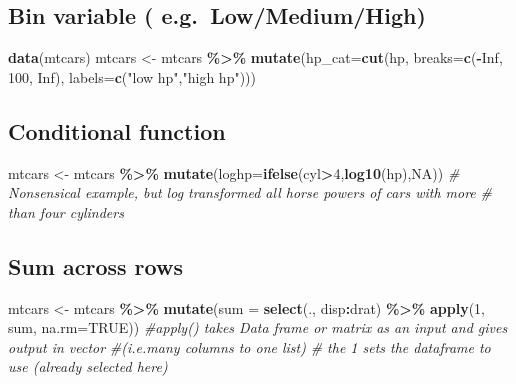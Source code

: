 \documentclass[
]{article}
\newenvironment{Shaded}{\begin{snugshade}}{\end{snugshade}}
\newcommand{\AttributeTok}[1]{\textcolor[rgb]{0.13,0.29,0.53}{#1}}
\newcommand{\CommentTok}[1]{\textcolor[rgb]{0.56,0.35,0.01}{\textit{#1}}}
\newcommand{\ConstantTok}[1]{\textcolor[rgb]{0.56,0.35,0.01}{#1}}
\newcommand{\DecValTok}[1]{\textcolor[rgb]{0.00,0.00,0.81}{#1}}
\newcommand{\FunctionTok}[1]{\textcolor[rgb]{0.13,0.29,0.53}{\textbf{#1}}}
\newcommand{\NormalTok}[1]{#1}
\newcommand{\OtherTok}[1]{\textcolor[rgb]{0.56,0.35,0.01}{#1}}
\newcommand{\SpecialCharTok}[1]{\textcolor[rgb]{0.81,0.36,0.00}{\textbf{#1}}}
\newcommand{\StringTok}[1]{\textcolor[rgb]{0.31,0.60,0.02}{#1}}
\begin{document}
\hypertarget{bin-variable-e.g.-lowmediumhigh}{%
\subsection{Bin variable ( e.g.~Low/Medium/High)}\label{bin-variable-e.g.-lowmediumhigh}}

\begin{Shaded}
\begin{Highlighting}[]
\FunctionTok{data}\NormalTok{(mtcars)}
\NormalTok{mtcars }\OtherTok{\textless{}{-}}\NormalTok{ mtcars }\SpecialCharTok{\%\textgreater{}\%} \FunctionTok{mutate}\NormalTok{(}\AttributeTok{hp\_cat=}\FunctionTok{cut}\NormalTok{(hp, }\AttributeTok{breaks=}\FunctionTok{c}\NormalTok{(}\SpecialCharTok{{-}}\ConstantTok{Inf}\NormalTok{, }\DecValTok{100}\NormalTok{, }\ConstantTok{Inf}\NormalTok{), }
                                       \AttributeTok{labels=}\FunctionTok{c}\NormalTok{(}\StringTok{"low hp"}\NormalTok{,}\StringTok{"high hp"}\NormalTok{)))}
\end{Highlighting}
\end{Shaded}

\hypertarget{conditional-function}{%
\subsection{Conditional function}\label{conditional-function}}

\begin{Shaded}
\begin{Highlighting}[]
\NormalTok{mtcars }\OtherTok{\textless{}{-}}\NormalTok{ mtcars }\SpecialCharTok{\%\textgreater{}\%} \FunctionTok{mutate}\NormalTok{(}\AttributeTok{loghp=}\FunctionTok{ifelse}\NormalTok{(cyl}\SpecialCharTok{\textgreater{}}\DecValTok{4}\NormalTok{,}\FunctionTok{log10}\NormalTok{(hp),}\ConstantTok{NA}\NormalTok{)) }
\CommentTok{\# Nonsensical example, but log transformed all horse powers of cars with more}
\CommentTok{\# than four cylinders}
\end{Highlighting}
\end{Shaded}

\hypertarget{sum-across-rows}{%
\subsection{Sum across rows}\label{sum-across-rows}}

\begin{Shaded}
\begin{Highlighting}[]
\NormalTok{mtcars }\OtherTok{\textless{}{-}}\NormalTok{ mtcars }\SpecialCharTok{\%\textgreater{}\%}  \FunctionTok{mutate}\NormalTok{(}\AttributeTok{sum =} \FunctionTok{select}\NormalTok{(., disp}\SpecialCharTok{:}\NormalTok{drat) }\SpecialCharTok{\%\textgreater{}\%} 
\FunctionTok{apply}\NormalTok{(}\DecValTok{1}\NormalTok{, sum, }\AttributeTok{na.rm=}\ConstantTok{TRUE}\NormalTok{))}
\CommentTok{\#apply() takes Data frame or matrix as an input and gives output in vector }
\CommentTok{\#(i.e.many columns to one list)}
\CommentTok{\# the \textquotesingle{}1\textquotesingle{} sets the dataframe to use (already selected here)}
\end{Highlighting}
\end{Shaded}
\end{document}

